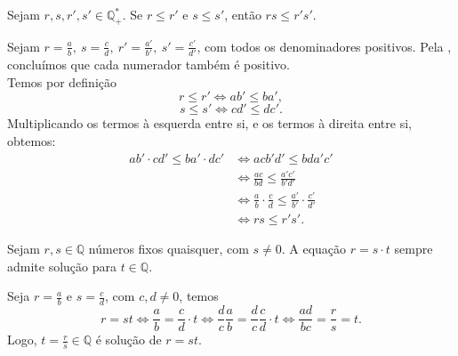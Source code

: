 \documentclass[../main.tex]{subfiles}
\begin{document}
\begin{prop}\label{rac-prop-produtoMaioresMaior}
    Sejam $r,s,r',s' \in \mathbb{Q}_{+}^*$. Se $r \leq r'$ e $s \leq s'$, então $rs \leq r's'$.
\end{prop}
\begin{dem}
    Sejam $r = \frac{a}{b},\ s = \frac{c}{d},\ r' = \frac{a'}{b'},\ s' = \frac{c'}{d'}$, com todos os denominadores positivos. Pela , concluímos que cada numerador também é positivo. \\
    Temos por definição
    \[ r \leq r' \iff ab' \leq ba', \]
    \[ s \leq s' \iff cd' \leq dc'. \]
    Multiplicando os termos à esquerda entre si, e os termos à direita entre si, obtemos:
     \begin{align*}
         ab' \cdot cd' \leq ba' \cdot dc' 
         &\iff acb'd' \leq bda'c' \\
         &\iff \frac{ac}{bd} \leq \frac{a'c'}{b'd'} \\
         &\iff \frac{a}{b} \cdot \frac{c}{d} \leq \frac{a'}{b'} \cdot \frac{c'}{d'} \\
         &\iff rs \leq r's'.
     \end{align*}
     
    
    
        
\end{dem}

\begin{prop}\label{rac-prop-solucaoAigualXB}
    Sejam $r,s \in \mathbb{Q}$ números fixos quaisquer, com $s \neq 0$. A equação $r = s \cdot t$ sempre admite solução para $t \in \mathbb{Q}$. 
\end{prop}
\begin{dem}
    Seja $r = \frac{a}{b}$ e $s = \frac{c}{d}$, com $c,d \neq 0$, temos
    \[ r = st \iff \frac{a}{b} = \frac{c}{d} \cdot t \iff \frac{d}{c}\frac{a}{b} = \frac{d}{c}\frac{c}{d}\cdot t \iff \frac{ad}{bc} = \frac{r}{s} = t.\]
    Logo, $t = \frac{r}{s} \in \mathbb{Q}$ é solução de $r=st$.
\end{dem}
\end{document}
